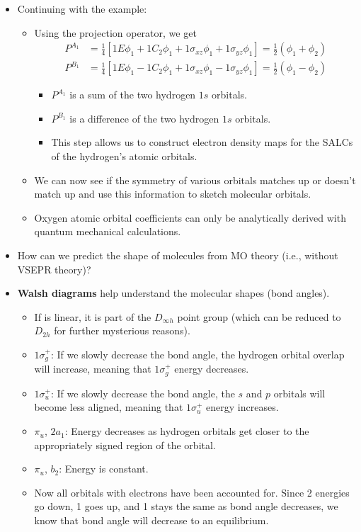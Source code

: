 \documentclass[../notes.tex]{subfiles}
\begin{document}
\begin{itemize}
\begin{itemize}
\begin{itemize}
        \end{itemize}
    \end{itemize}
    \item Continuing with the  example:
    \begin{itemize}
        \item Using the projection operator, we get
        \begin{align*}
            P^{A_1} &= \frac{1}{4}[1E\phi_1+1C_2\phi_1+1\sigma_{xz}\phi_1+1\sigma_{yz}\phi_1] = \frac{1}{2}(\phi_1+\phi_2)\\
            P^{B_1} &= \frac{1}{4}[1E\phi_1-1C_2\phi_1+1\sigma_{xz}\phi_1-1\sigma_{yz}\phi_1] = \frac{1}{2}(\phi_1-\phi_2)
        \end{align*}
        \begin{itemize}
            \item $P^{A_1}$ is a sum of the two hydrogen $1s$ orbitals.
            \item $P^{B_1}$ is a difference of the two hydrogen $1s$ orbitals.
            \item This step allows us to construct electron density maps for the SALCs of the hydrogen's atomic orbitals.
        \end{itemize}
        \item We can now see if the symmetry of various orbitals matches up or doesn't match up and use this information to sketch molecular orbitals.
        \item Oxygen atomic orbital coefficients can only be analytically derived with quantum mechanical calculations.
    \end{itemize}
    \item How can we predict the shape of molecules from MO theory (i.e., without VSEPR theory)?
    \item \textbf{Walsh diagrams} help understand the molecular shapes (bond angles).
    \begin{itemize}
        \item If  is linear, it is part of the $D_{\infty h}$ point group (which can be reduced to $D_{2h}$ for further mysterious reasons).
        \item $1\sigma_g^+$: If we slowly decrease the bond angle, the hydrogen orbital overlap will increase, meaning that $1\sigma_g^+$ energy decreases.
        \item $1\sigma_u^+$: If we slowly decrease the bond angle, the $s$ and $p$ orbitals will become less aligned, meaning that $1\sigma_u^+$ energy increases.
        \item $\pi_u$, $2a_1$: Energy decreases as hydrogen orbitals get closer to the appropriately signed region of the  orbital.
        \item $\pi_u$, $b_2$: Energy is constant.
        \item Now all orbitals with electrons have been accounted for. Since 2 energies go down, 1 goes up, and 1 stays the same as bond angle decreases, we know that bond angle will decrease to an equilibrium.
    \end{itemize}
\end{itemize}
\end{document}
